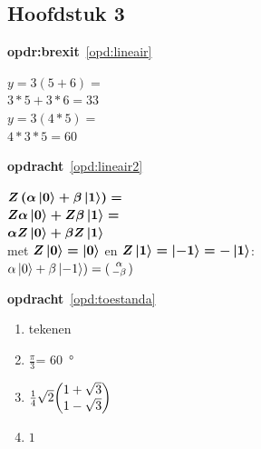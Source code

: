 \documentclass[../../main.tex]{subfiles}
\begin{document}
\subsection*{Hoofdstuk 3}

\textbf{opdr:brexit}~\ref{opd:lineair}

$y=3(5+6)=$\\$3*5+3*6=33$\\
$y=3(4*5)=$\\$4*3*5=60$


\textbf{opdracht}~\ref{opd:lineair2}%

$\port{$Z$}\left(\alpha\ket{0}+\beta\ket{1}\right)  =$\\
$\port{$Z$}\alpha \ket{0}+\port{$Z$}\beta \ket{1}  = $\\
$\alpha \port{$Z$}\ket{0}+\beta \port{$Z$}\ket{1}$\\
met $\port{$Z$}\ket{0}=\ket{0}$ en $\port{$Z$}\ket{1}=\ket{-1}=-\ket{1}$: \\
$\alpha\ket{0}+\beta\ket{-1})   =  \smqty(\alpha\\ -\beta)$

\textbf{opdracht}~\ref{opd:toestanda}%

\begin{enumerate}
\item tekenen
\item $\tfrac{\pi}{3}$= \SI{60}{\degree}
\item $\tfrac{1}{4}\sqrt{2}\mqty(1+\sqrt{3}\\ 1-\sqrt{3})$
\item $1$
\end{enumerate}
\end{document}
